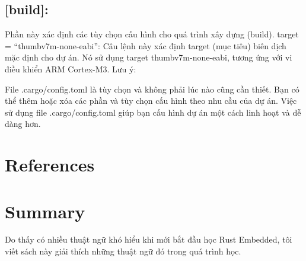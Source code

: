 \documentclass[
  letterpaper,
  DIV=11,
  numbers=noendperiod]{scrreprt}
\newlength{\cslhangindent}
\newenvironment{CSLReferences}[2] %
 {\begin{list}{}{%
  \setlength{\itemindent}{0pt}
  \setlength{\leftmargin}{0pt}
  \setlength{\parsep}{0pt}
  \ifodd #1
   \setlength{\leftmargin}{\cslhangindent}
   \setlength{\itemindent}{-1\cslhangindent}
  \fi
  \setlength{\itemsep}{#2\baselineskip}}}
 {\end{list}}
\begin{document}
\section{{[}build{]}:}\label{build}

Phần này xác định các tùy chọn cấu hình cho quá trình xây dựng (build).
target = ``thumbv7m-none-eabi'': Câu lệnh này xác định target (mục tiêu)
biên dịch mặc định cho dự án. Nó sử dụng target thumbv7m-none-eabi,
tương ứng với vi điều khiển ARM Cortex-M3. Lưu ý:

File .cargo/config.toml là tùy chọn và không phải lúc nào cũng cần
thiết. Bạn có thể thêm hoặc xóa các phần và tùy chọn cấu hình theo nhu
cầu của dự án. Việc sử dụng file .cargo/config.toml giúp bạn cấu hình dự
án một cách linh hoạt và dễ dàng hơn.


\chapter*{References}\label{references}


\label{refs}
\begin{CSLReferences}{0}{1}
\end{CSLReferences}


\chapter*{Summary}\label{summary}


Do thấy có nhiều thuật ngữ khó hiểu khi mới bắt đầu học Rust Embedded,
tôi viết sách này giải thích những thuật ngữ đó trong quá trình học.
\end{document}
